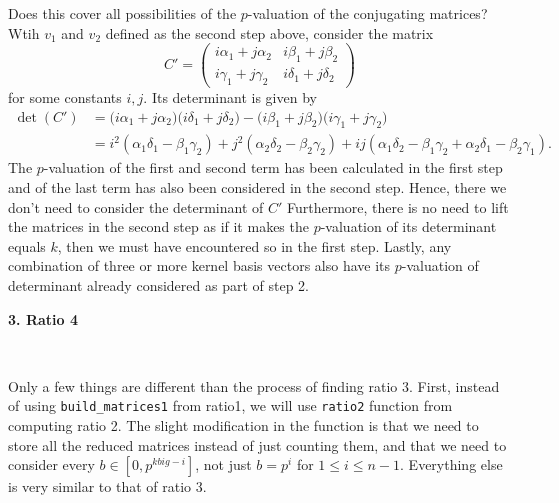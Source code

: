 \documentclass[letterpaper,12pt]{article}
\begin{document}
Does this cover all possibilities of the $p$-valuation of the conjugating matrices?
Wtih $v_1$ and $v_2$ defined as the second step above, consider the matrix 
\[
C' = \begin{pmatrix}
i\alpha_1 + j\alpha_2 & i\beta_1 + j\beta_2 \\
i\gamma_1 + j\gamma_2 & i\delta_1 + j\delta_2
\end{pmatrix}
\]
for some constants $i, j$.
Its determinant is given by 
\begin{align*}
\det(C') &= \big(i\alpha_{1} + j\alpha_{2}\big)\big(i\delta_{1} + j\delta_{2}\big)-
\big(i\beta_{1} + j\beta_{2}\big)\big(i\gamma_{1} + j\gamma_{2}\big) \\
&= i^2(\alpha_1 \delta_1 - \beta_1 \gamma_2) + j^2(\alpha_2 \delta_2 - \beta_2 \gamma_2)
+ ij(\alpha_1 \delta_2 - \beta_1 \gamma_2 + \alpha_2 \delta_1 - \beta_2 \gamma_1).
\end{align*}
The $p$-valuation of the first and second term has been calculated in the first step
and of the last term has also been considered in the second step.
Hence, there we don't need to consider the determinant of $C'$
Furthermore, there is no need to lift the matrices in the second step
as if it makes the $p$-valuation of its determinant equals $k$, then 
we must have encountered so in the first step.
Lastly, any combination of three or more kernel basis vectors also 
have its $p$-valuation of determinant already considered as part of step 2.

\vspace{0.6in}

{\bf \LARGE 3. Ratio 4}

\

Only a few things are different than the process of finding ratio 3.
First, instead of using \texttt{build\_matrices1} from ratio1,
we will use \texttt{ratio2} function from computing ratio 2.
The slight modification in the function is that we need to store all the reduced matrices
instead of just counting them, and that we need to consider every $b \in [0, p^{kbig - i}]$,
not just $b = p^i$ for $1 \leq i \leq n-1$.
Everything else is very similar to that of ratio 3.

\end{document}
